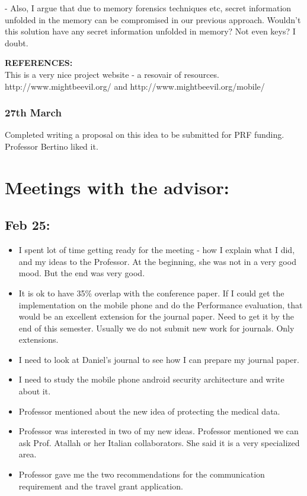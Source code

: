 \documentclass[11pt]{article}
\begin{document}
- Also, I argue that due to memory forensics techniques etc, secret information unfolded in the memory can be compromised in our previous approach. 
Wouldn't this solution have any secret information unfolded in memory? Not even keys? I doubt.

\textbf{REFERENCES:}\\
This is a very nice project website - a resovair of resources. http://www.mightbeevil.org/ and http://www.mightbeevil.org/mobile/

\subsubsection*{27th March}
Completed writing a proposal on this idea to be submitted for PRF funding. Professor Bertino liked it.

\pagebreak
\section*{Meetings with the advisor:}
\subsection*{Feb 25:}
\begin{itemize}
 \item I spent lot of time getting ready for the meeting - how I explain what I did, and my ideas to the Professor. At the beginning, she was not in 
a very good mood. But the end was very good.
\item It is ok to have 35\% overlap with the conference paper. If I could get the implementation on the mobile phone and do the Performance 
evaluation, that would be an excellent extension for the journal paper. Need to get it by the end of this semester. Usually we do not submit new work 
for journals. Only extensions.
\item I need to look at Daniel's journal to see how I can prepare my journal paper.
\item I need to study the mobile phone android security architecture and write about it.
\item Professor mentioned about the new idea of protecting the medical data.
\item Professor was interested in two of my new ideas. Professor mentioned we can ask Prof. Atallah or her Italian collaborators. She said it is a 
very specialized area.
\item Professor gave me the two recommendations for the communication requirement and the travel grant application.
\end{itemize}
\end{document}

